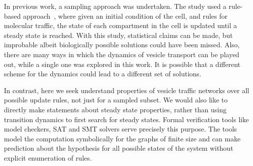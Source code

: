 In previous work, a sampling approach was undertaken. 
%
The study used a rule-based approach~\cite{mani2016stacking}, where given an initial condition of the cell, and rules for molecular traffic, the state of each compartment in the cell is updated until a steady state is reached. 
%
With this study, statistical claims can be made, but improbable albeit biologically possible solutions could have been missed.
%
Also, there are many ways in which the dynamics of vesicle transport can be played out, while a single one was explored in this work. 
%
It is possible that a different scheme for the dynamics could lead to a different set of solutions.

%
%
%
%
%
%
%
%

In contrast, here we seek understand properties of vesicle traffic networks over all possible update rules, not just for a sampled subset. 
%
We would also like to directly make statements about steady state properties, rather
than using transition dynamics to first search for steady states. 
%
Formal verification tools like model checkers, SAT and SMT solvers serve precisely this purpose. 
%
The tools model the computation symbolically for the graphs of finite size and can make prediction about the hypothesis for all possible states of the system without explicit enumeration of rules. 
%

